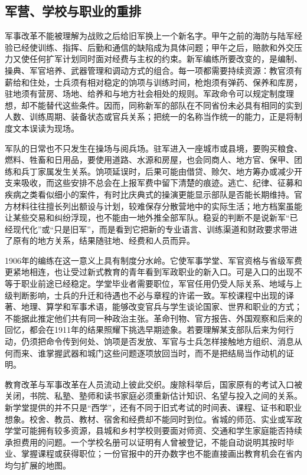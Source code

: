 \subsection{军营、学校与职业的重排}

军事改革不能被理解为战败之后给旧军换上一个新名字。甲午之前的海防与陆军经验已经使训练、指挥、后勤和通信的缺陷成为具体问题；甲午之后，赔款和外交压力又使任何扩军计划同时面对经费与主权的约束。新军编练所要改变的，是编制、操典、军官培养、武器管理和调动方式的组合。每一项都需要持续资源：教官须有薪给和住处，士兵须有相对稳定的饷项与训练时间，枪炮须有弹药、保养和库房，驻地须有营房、场地、给养和与地方社会相处的规则。军政命令可以规定制度理想，却不能替代这些条件。因而，同称新军的部队在不同省份未必具有相同的实到人数、训练周期、装备状态或官兵关系；把统一的名称当作统一的能力，正是将制度文本误读为现场。

军队的日常也不只发生在操场与阅兵场。驻军进入一座城市或县境，要购买粮食、燃料、牲畜和日用品，要使用道路、水源和房屋，也会同商人、地方官、保甲、团练和兵丁家属发生关系。饷项延误时，后果可能由借贷、赊欠、地方筹办或减少开支来吸收，而这些安排不总会在上报军费中留下清楚的痕迹。逃亡、纪律、征募和疾病之类看似细小的案件，有时比庆典式的操演更能显示部队是否能长期维持。官方材料往往擅长列出额设与计划，较难保存分散营地中的实际生活；地方档案虽能让某些交易和纠纷浮现，也不能由一地外推全部军队。稳妥的判断不是说新军“已经现代化”或“只是旧军”，而是看到它把新的专业语言、训练渠道和财政要求带进了原有的地方关系，结果随驻地、经费和人员而异。

1906年的编练在这一意义上具有制度分水岭。它使军事学堂、军官资格与省级军费更紧地相连，也让受过新式教育的青年看到军政职业的新入口。可是入口的出现不等于职业前途已经稳定。学堂毕业者需要职位，军官任用仍受人际关系、地域与上级判断影响，士兵的升迁和待遇也不必与章程的许诺一致。军校课程中出现的译著、地理、算学和军事术语，能够改变官兵与学生谈论国家、世界和职业的方式；不能据此推定他们共有同一种政治主张。革命刊物、官方报告、外国观察和后来的回忆，都会在1911年的结果照耀下挑选早期迹象。若要理解某支部队后来为何行动，仍须把命令传到何处、饷项是否发放、军官与士兵怎样接触地方组织、消息从何而来、谁掌握武器和城门这些问题逐项放回当时，而不是把结局当作动机的证明。

教育改革与军事改革在人员流动上彼此交织。废除科举后，国家原有的考试入口被关闭，书院、私塾、塾师和读书家庭必须重新估计知识、名望与投入之间的关系。新学堂提供的并不只是“西学”，还有不同于旧式考试的时间表、课程、证书和职业想象。校舍、教员、教材、宿舍和经费却不能同时到位。省城的师范、实业或军政学堂可能拥有较多资源，县城和乡村学校则要面对师资、交通和学生家庭能否持续承担费用的问题。一个学校名册可以证明有人曾被登记，不能自动说明其按时毕业、掌握课程或获得职位；一份官报中的开办数字也不能直接画出教育机会在省内均匀扩展的地图。

